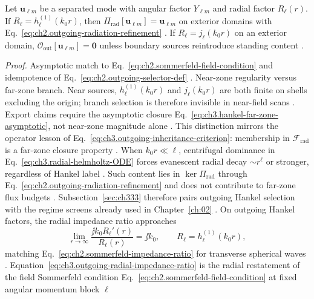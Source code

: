 \begin{proposition}
\label{prop:ch3.radial-outgoing-commutes}
Let \(\mathbf{u}_{\ell m}\) be a separated mode with angular factor \(Y_{\ell m}\) and radial factor
\(R_{\ell}(r)\). If \(R_{\ell}=h_{\ell}^{(1)}(k_{0}r)\), then
\(\Pi_{\mathrm{rad}}[\mathbf{u}_{\ell m}]=\mathbf{u}_{\ell m}\) on exterior domains with
Eq.~\eqref{eq:ch2.outgoing-radiation-refinement} \cite{stratton1941}. If
\(R_{\ell}=j_{\ell}(k_{0}r)\) on an exterior domain, \(\mathcal{O}_{\mathrm{out}}[\mathbf{u}_{\ell m}]=\mathbf{0}\)
unless boundary sources reintroduce standing content \cite{jackson1999}.
\end{proposition}
\noindent\textit{Proof.}
Asymptotic match to Eq.~\eqref{eq:ch2.sommerfeld-field-condition} and idempotence of
Eq.~\eqref{eq:ch2.outgoing-selector-def} \cite{stratton1941}.
Near-zone regularity versus far-zone branch. Near sources, \(h_{\ell}^{(1)}(k_{0}r)\) and \(j_{\ell}(k_{0}r)\) are both finite on shells excluding the
origin; branch selection is therefore invisible in near-field scans \cite{harrington2001}. Export
claims require the asymptotic closure Eq.~\eqref{eq:ch3.hankel-far-zone-asymptotic}, not near-zone
magnitude alone \cite{harrington2001}. This distinction mirrors the operator lesson of
Eq.~\eqref{eq:ch3.outgoing-inheritance-criterion}: membership in \(\mathcal{F}_{\mathrm{rad}}\) is a far-zone
closure property \cite{stratton1941}.
When \(k_{0}r\ll\ell\), centrifugal dominance in Eq.~\eqref{eq:ch3.radial-helmholtz-ODE} forces evanescent
radial decay \(\sim r^{\ell}\) or stronger, regardless of Hankel label \cite{jackson1999}. Such content lies in
\(\ker\Pi_{\mathrm{rad}}\) through Eq.~\eqref{eq:ch2.outgoing-radiation-refinement} and does not contribute to
far-zone flux budgets \cite{harrington2001}. Subsection~\ref{sec:ch333} therefore pairs outgoing
Hankel selection with the regime screens already used in Chapter~\ref{ch:02} \cite{harrington2001}.
On outgoing Hankel factors, the radial impedance ratio approaches
\begin{equation}
\label{eq:ch3.outgoing-radial-impedance-ratio}
\lim_{r\to\infty}
\frac{\jj k_{0}R_{\ell}'(r)}{R_{\ell}(r)}
=\jj k_{0},
\qquad
R_{\ell}=h_{\ell}^{(1)}(k_{0}r),
\end{equation}
matching Eq.~\eqref{eq:ch2.sommerfeld-impedance-ratio} for transverse spherical waves \cite{stratton1941}.
Equation~\eqref{eq:ch3.outgoing-radial-impedance-ratio} is the radial restatement of the field Sommerfeld
condition Eq.~\eqref{eq:ch2.sommerfeld-field-condition} at fixed angular momentum block \(\ell\)

